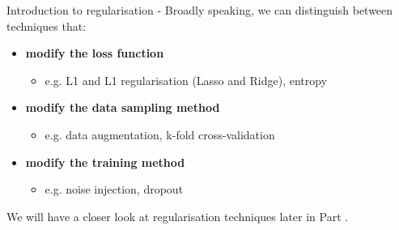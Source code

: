 \begin{frame}[t,allowframebreaks]{Introduction to regularisation -}
Broadly speaking, we can distinguish between techniques that:\\
\vspace{0.1cm}
\begin{itemize}
    \item 
    {\bf modify the \gls{loss function}}
    \begin{itemize}
        \item e.g. L1 and L1 \gls{regularisation} (Lasso and Ridge), entropy
    \end{itemize}
    \vspace{0.1cm}
    \item
    {\bf modify the data sampling method}
    \begin{itemize}
        \item e.g. data augmentation, k-fold cross-validation
    \end{itemize}
    \vspace{0.1cm}
    \item
    {\bf modify the training method}
    \begin{itemize}
        \item e.g. noise injection, dropout
    \end{itemize}
\end{itemize}

\vspace{0.3cm}

We will have a closer look at \gls{regularisation} 
techniques later in Part {\thispart}.\\

\end{frame}